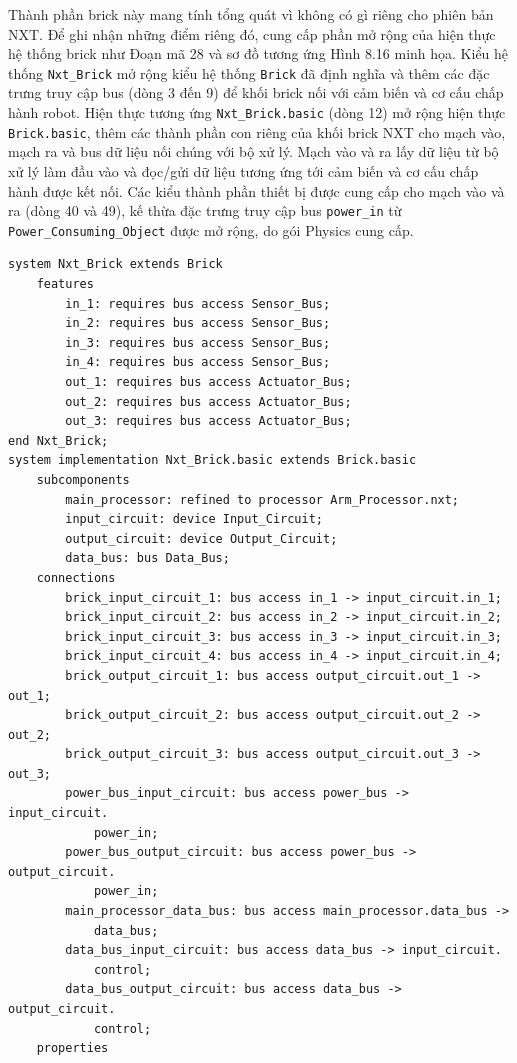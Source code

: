 Thành phần brick này mang tính tổng quát vì không có gì riêng cho phiên bản NXT. Để ghi nhận những điểm riêng đó, cung cấp phần mở rộng của hiện thực hệ thống brick như Đoạn mã 28 và sơ đồ tương ứng Hình 8.16 minh họa. Kiểu hệ thống \texttt{Nxt\_Brick} mở rộng kiểu hệ thống \texttt{Brick} đã định nghĩa và thêm các đặc trưng truy cập bus (dòng 3 đến 9) để khối brick nối với cảm biến và cơ cấu chấp hành robot. Hiện thực tương ứng \texttt{Nxt\_Brick.basic} (dòng 12) mở rộng hiện thực \texttt{Brick.basic}, thêm các thành phần con riêng của khối brick NXT cho mạch vào, mạch ra và bus dữ liệu nối chúng với bộ xử lý. Mạch vào và ra lấy dữ liệu từ bộ xử lý làm đầu vào và
đọc/gửi dữ liệu tương ứng tới cảm biến và cơ cấu chấp hành được kết nối. Các kiểu thành phần thiết bị được cung cấp cho mạch vào và ra (dòng 40 và 49), kế thừa đặc trưng truy cập bus \texttt{power\_in} từ \texttt{Power\_Consuming\_Object} được mở rộng, do gói Physics cung cấp.
\begin{verbatim}
system Nxt_Brick extends Brick
    features
        in_1: requires bus access Sensor_Bus;
        in_2: requires bus access Sensor_Bus;
        in_3: requires bus access Sensor_Bus;
        in_4: requires bus access Sensor_Bus;
        out_1: requires bus access Actuator_Bus;
        out_2: requires bus access Actuator_Bus;
        out_3: requires bus access Actuator_Bus;
end Nxt_Brick;
system implementation Nxt_Brick.basic extends Brick.basic
    subcomponents
        main_processor: refined to processor Arm_Processor.nxt;
        input_circuit: device Input_Circuit;
        output_circuit: device Output_Circuit;
        data_bus: bus Data_Bus;
    connections
        brick_input_circuit_1: bus access in_1 -> input_circuit.in_1;
        brick_input_circuit_2: bus access in_2 -> input_circuit.in_2;
        brick_input_circuit_3: bus access in_3 -> input_circuit.in_3;
        brick_input_circuit_4: bus access in_4 -> input_circuit.in_4;
        brick_output_circuit_1: bus access output_circuit.out_1 -> out_1;
        brick_output_circuit_2: bus access output_circuit.out_2 -> out_2;
        brick_output_circuit_3: bus access output_circuit.out_3 -> out_3;
        power_bus_input_circuit: bus access power_bus -> input_circuit.
            power_in;
        power_bus_output_circuit: bus access power_bus -> output_circuit.
            power_in;
        main_processor_data_bus: bus access main_processor.data_bus ->
            data_bus;
        data_bus_input_circuit: bus access data_bus -> input_circuit.
            control;
        data_bus_output_circuit: bus access data_bus -> output_circuit.
            control;
    properties
\end{verbatim}
